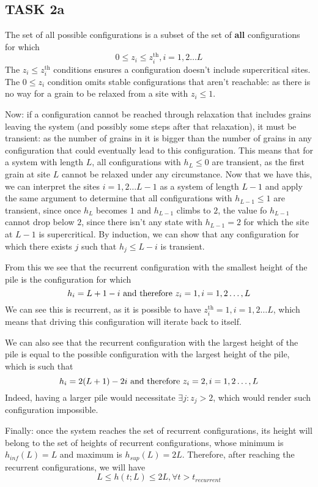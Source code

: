 \documentclass[a4paper,12pt]{article}
\begin{document}
\subsection{TASK 2a}

The set of all possible configurations is a subset of the set of \textbf{all} configurations for which
$$0\leq z_i\leq z_i^{\mathrm{th}}, i=1, 2 \dots L$$
The $z_i\leq z_i^{\mathrm{th}}$ conditions ensures a configuration doesn't include supercritical sites. The $0\leq z_i$ condition omits stable configurations that aren't reachable: as there is no way for a grain to be relaxed from a site with $z_i\leq 1$.

Now: if a configuration cannot be reached through relaxation that includes grains leaving the system (and possibly some steps after that relaxation), it must be transient: as the number of grains in it is bigger than the number of grains in any configuration that could eventually lead to this configuration. This means that for a system with length $L$, all configurations with $h_L \leq 0$ are transient, as the first grain at site $L$ cannot be relaxed under any circumstance. Now that we have this, we can interpret the sites $i=1, 2\dots L-1$ as a system of length $L-1$ and apply the same argument to determine that all configurations with $h_{L-1} \leq 1$ are transient, since once $h_L$ becomes $1$ and $h_{L-1}$ climbs to $2$, the value fo $h_{L-1}$ cannot drop below $2$, since there isn't any state with $h_{L-1} = 2$ for which the site at $L-1$ is supercritical. By induction, we can show that any configuration for which there exists $j$ such that $h_j\leq L-i$ is transient.

From this we see that the recurrent configuration with the smallest height of the pile is the configuration for which
$$h_i=L+1-i\hbox{ and therefore }z_i=1, i = 1, 2\dots, L$$
We can see this is recurrent, as it is possible to have $z_i^\mathrm{th}=1, i=1, 2\dots L$, which means that driving this configuration will iterate back to itself.

We can also see that the recurrent configuration with the largest height of the pile is equal to the possible configuration with the largest height of the pile, which is such that
$$h_i=2(L+1)-2i\hbox{ and therefore }z_i=2, i = 1, 2\dots, L$$
Indeed, having a larger pile would necessitate $\exists j:z_j>2$, which would render such configuration impossible.

Finally: once the system reaches the set of recurrent configurations, its height will belong to the set of heights of recurrent configurations, whose minimum is $h_{inf}(L)=L$ and maximum is $h_{sup}(L)=2L$. Therefore, after reaching the recurrent configurations, we will have
$$L\leq h(t; L) \leq 2L, \forall t > t_{recurrent}$$
\end{document}
